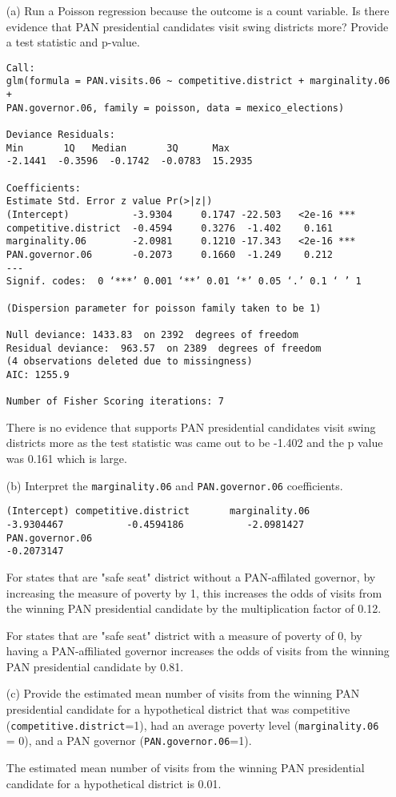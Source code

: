\documentclass[12pt,letterpaper]{article}
\begin{document}
\begin{enumerate}
	\item [(a)]
	Run a Poisson regression because the outcome is a count variable. Is there evidence that PAN presidential candidates visit swing districts more? Provide a test statistic and p-value.
\begin{verbatim}
Call:
glm(formula = PAN.visits.06 ~ competitive.district + marginality.06 + 
PAN.governor.06, family = poisson, data = mexico_elections)

Deviance Residuals: 
Min       1Q   Median       3Q      Max  
-2.1441  -0.3596  -0.1742  -0.0783  15.2935  

Coefficients:
Estimate Std. Error z value Pr(>|z|)    
(Intercept)           -3.9304     0.1747 -22.503   <2e-16 ***
competitive.district  -0.4594     0.3276  -1.402    0.161    
marginality.06        -2.0981     0.1210 -17.343   <2e-16 ***
PAN.governor.06       -0.2073     0.1660  -1.249    0.212    
---
Signif. codes:  0 ‘***’ 0.001 ‘**’ 0.01 ‘*’ 0.05 ‘.’ 0.1 ‘ ’ 1

(Dispersion parameter for poisson family taken to be 1)

Null deviance: 1433.83  on 2392  degrees of freedom
Residual deviance:  963.57  on 2389  degrees of freedom
(4 observations deleted due to missingness)
AIC: 1255.9

Number of Fisher Scoring iterations: 7
\end{verbatim}

There is no evidence that supports PAN presidential candidates visit swing districts more as the test statistic was came out to be -1.402 and the p value was 0.161 which is large. 
	\item [(b)]
	Interpret the \texttt{marginality.06} and \texttt{PAN.governor.06} coefficients.
	
\begin{verbatim}	
(Intercept) competitive.district       marginality.06 
-3.9304467           -0.4594186           -2.0981427 
PAN.governor.06 
-0.2073147 
\end{verbatim}	

For states that are "safe seat" district without a PAN-affilated governor, by increasing the measure of poverty by 1, this increases the odds of visits from the winning PAN presidential candidate by the multiplication factor of 0.12. 

For states that are "safe seat" district with a measure of poverty of 0, by having a PAN-affiliated governor increases the odds of visits from the winning PAN presidential candidate by 0.81. 


	\item [(c)]
	Provide the estimated mean number of visits from the winning PAN presidential candidate for a hypothetical district that was competitive (\texttt{competitive.district}=1), had an average poverty level (\texttt{marginality.06} = 0), and a PAN governor (\texttt{PAN.governor.06}=1).
	
The estimated mean number of visits from the winning PAN presidential candidate for a hypothetical district is 0.01. 
	
\end{enumerate}
	
\end{document}
